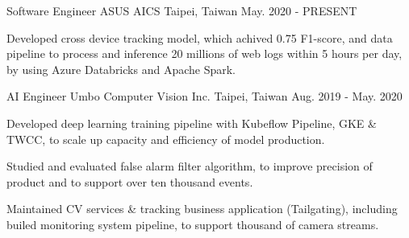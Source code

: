 

\begin{cventries}

  \cventry
    {Software Engineer} %
    {ASUS AICS} %
    {Taipei, Taiwan} %
    {May. 2020 - PRESENT} %
    {
      \begin{cvitems} %
        \item {Developed cross device tracking model, which achived 0.75 F1-score, and data pipeline to process and inference 20 millions of web logs within 5 hours per day, by using Azure Databricks and Apache Spark.}
      \end{cvitems}
    }

  \cventry
    {AI Engineer} %
    {Umbo Computer Vision Inc.} %
    {Taipei, Taiwan} %
    {Aug. 2019 - May. 2020} %
    {
      \begin{cvitems} %
        \item {Developed deep learning training pipeline with Kubeflow Pipeline, GKE \& TWCC, to scale up capacity and efficiency of model production.}
        \item {Studied and evaluated false alarm filter algorithm, to improve precision of product and to support over ten thousand events.}
        \item {Maintained CV services \& tracking business application (Tailgating), including builed monitoring system pipeline, to support thousand of camera streams.}
      \end{cvitems}
    }


\end{cventries}
